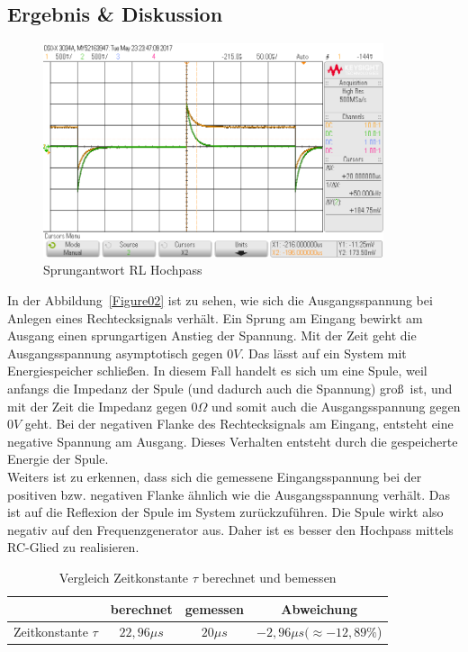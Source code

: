 \documentclass[12pt,a4paper,titlepage]{article}
\begin{document}
\subsection{Ergebnis \& Diskussion}
\begin{figure}[H]
  \centering
  \includegraphics[width=100mm]{sprungantwort_rl_hochpass.png}
  \caption{Sprungantwort RL Hochpass}
  \label{Figure07}
\end{figure}
\noindent In der Abbildung~\ref{Figure02} ist zu sehen, wie sich die Ausgangsspannung bei Anlegen eines Rechtecksignals verh\"alt. Ein Sprung am Eingang bewirkt am Ausgang einen sprungartigen Anstieg der Spannung. Mit der Zeit geht die Ausgangsspannung asymptotisch gegen $0V$. Das l\"asst auf ein System mit Energiespeicher schlie\ss en. In diesem Fall handelt es sich um eine Spule, weil anfangs die Impedanz der Spule (und dadurch auch die Spannung) gro\ss \, ist, und mit der Zeit die Impedanz gegen $0 \Omega$ und somit auch die Ausgangsspannung gegen $0V$ geht. Bei der negativen Flanke des Rechtecksignals am Eingang, entsteht eine negative Spannung am Ausgang. Dieses Verhalten entsteht durch die gespeicherte Energie der Spule. \\
Weiters ist zu erkennen, dass sich die gemessene Eingangsspannung bei der positiven bzw. negativen Flanke \"ahnlich wie die Ausgangsspannung verh\"alt. Das ist auf die Reflexion der Spule im System zur\"uckzuf\"uhren. Die Spule wirkt also negativ auf den Frequenzgenerator aus. Daher ist es besser den Hochpass mittels RC-Glied zu realisieren.

\begin{table}[H]
\centering
\begin{tabular}{|c|c|c|c|}
\hline
& berechnet    & gemessen    & Abweichung \\ \hline
Zeitkonstante $\tau$ & $22,96 \mu s$  & $20 \mu s$      & $-2,96 \mu s (\approx-12,89 \%$) \\ \hline
\end{tabular}
\caption{Vergleich Zeitkonstante $\tau$ berechnet und bemessen}
\label{Figure03}
\end{table}
\end{document}
